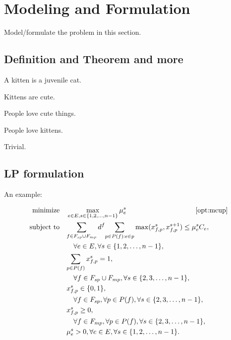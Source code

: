 \section{Modeling and Formulation}
\label{sec:model}

Model/formulate the problem in this section.

\subsection{Definition and Theorem and more}

\begin{definition}
A kitten is a juvenile cat.
\end{definition}

\begin{property}
Kittens are cute.
\end{property}

\begin{lemma}
People love cute things.
\end{lemma}

\begin{theorem}\label{theorem:TheFatTreeInApx}
People love kittens.
\end{theorem}

\begin{IEEEproof}
Trivial.
\end{IEEEproof}

\subsection{LP formulation}
An example:

\begin{subequations}\label{opt:mcup}
\begin{align}
\text{minimize} & \quad\max_{e \in E,s \in \{1, 2, \dots, n-1 \}} \mu_e^s \quad\quad\quad\quad\quad\quad\quad\quad\quad\quad\eqref{opt:mcup}\notag\\
\text{subject to} & \quad {\sum_{f \in F_{sp} \cup F_{mp}} d^f {\sum_{p \in P(f): e\in p} \max(x_{f,p}^s},x_{f,p}^{s+1})}
\leq \mu_e^s C_{e}, \notag \\
& \quad\quad\forall e \in E, \forall s \in \{1, 2, \dots, n-1 \}, \label{equ:CapacityConstraint}\\
& \quad{\sum_{p \in P(f)} x_{f,p}^s} = 1, \notag \\
& \quad\quad\forall f \in F_{sp} \cup F_{mp}, \forall s \in \{2, 3, \dots, n-1 \}, \label{equ:SumConstraint}\\
& \quad x_{f,p}^s \in \{0,1\}, \notag \\
& \quad\quad\forall f \in F_{sp}, \forall p \in P(f), \forall s \in \{2, 3, \dots, n-1 \}, \label{equ:SinglePath}\\
& \quad x_{f,p}^s \geq 0, \notag \\
& \quad\quad\forall f \in F_{mp}, \forall p \in P(f), \forall s \in \{2, 3, \dots, n-1 \},
\label{equ:Multipath}\\
& \quad\mu_e^s > 0, \forall e \in E, \forall s \in \{1, 2, \dots, n-1 \}. \label{equ:ObjPositiveCostraint}
\end{align}
\end{subequations}
